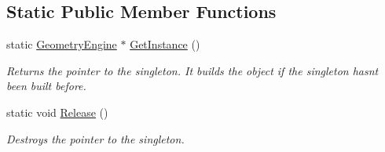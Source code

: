 \subsection*{Static Public Member Functions}
\begin{DoxyCompactItemize}
\item 
\mbox{\label{class_geometry_engine_1_1_geometry_engine_ad3db079180166e79c3f37d8d487f2c29}} 
static \mbox{\hyperlink{class_geometry_engine_1_1_geometry_engine}{Geometry\+Engine}} $\ast$ \mbox{\hyperlink{class_geometry_engine_1_1_geometry_engine_ad3db079180166e79c3f37d8d487f2c29}{Get\+Instance}} ()
\begin{DoxyCompactList}\small\item\em Returns the pointer to the singleton. It builds the object if the singleton hasn\textquotesingle{}t been built before. \end{DoxyCompactList}\item 
\mbox{\label{class_geometry_engine_1_1_geometry_engine_a2c2e044075bfe61e6e18a07061072172}} 
static void \mbox{\hyperlink{class_geometry_engine_1_1_geometry_engine_a2c2e044075bfe61e6e18a07061072172}{Release}} ()
\begin{DoxyCompactList}\small\item\em Destroys the pointer to the singleton. \end{DoxyCompactList}\end{DoxyCompactItemize}
